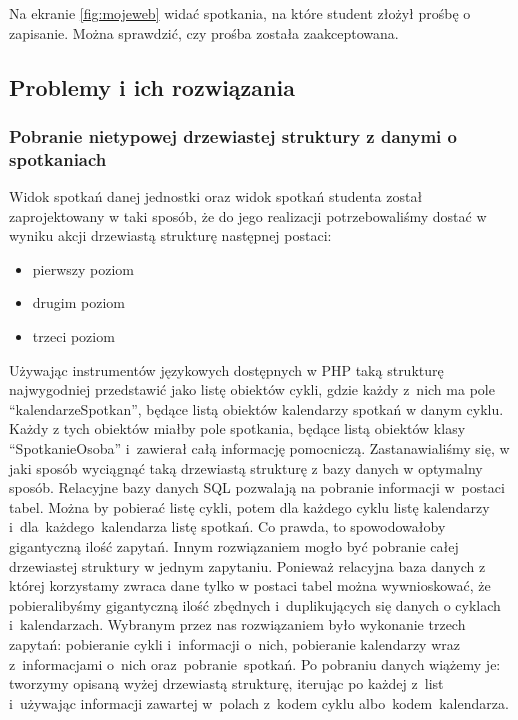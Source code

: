 \documentclass[licencjacka]{pracamgr}
\begin{document}
\begin{itemize}
Na ekranie \ref{fig:mojeweb} widać spotkania, na które student złożył prośbę o zapisanie. Można sprawdzić, czy prośba została zaakceptowana.

\subsection{Problemy i ich rozwiązania}
\subsubsection{Pobranie nietypowej drzewiastej struktury z danymi o spotkaniach}
Widok spotkań danej jednostki oraz widok spotkań studenta został zaprojektowany w taki sposób, że do jego realizacji potrzebowaliśmy dostać w wyniku akcji drzewiastą strukturę następnej postaci:

\begin{itemize}
\item{pierwszy poziom}
\item{drugim poziom}
\item{trzeci poziom}
\end{itemize}
Używając instrumentów językowych dostępnych w PHP taką strukturę najwygodniej przedstawić jako listę obiektów cykli, gdzie każdy z~nich ma pole \enquote{kalendarzeSpotkan}, będące listą obiektów kalendarzy spotkań w danym cyklu. Każdy z tych obiektów miałby pole spotkania, będące listą obiektów klasy \enquote{SpotkanieOsoba} i~zawierał całą informację pomocniczą. 
Zastanawialiśmy się, w jaki sposób wyciągnąć taką drzewiastą strukturę z bazy danych w optymalny sposób. Relacyjne bazy danych SQL pozwalają na pobranie informacji w~postaci tabel. Można by pobierać listę cykli, potem dla każdego cyklu listę kalendarzy i~dla~każdego~kalendarza listę spotkań. Co prawda, to spowodowałoby gigantyczną ilość zapytań. Innym rozwiązaniem mogło być pobranie całej drzewiastej struktury w jednym zapytaniu. Ponieważ relacyjna baza danych z której korzystamy zwraca dane tylko w postaci tabel można wywnioskować, że pobieralibyśmy gigantyczną ilość zbędnych i~duplikujących się danych o cyklach i~kalendarzach. Wybranym przez nas rozwiązaniem było wykonanie trzech zapytań: pobieranie cykli i~informacji o~nich, pobieranie kalendarzy wraz z~informacjami o~nich oraz~pobranie~spotkań. Po pobraniu danych wiążemy je: tworzymy opisaną wyżej drzewiastą strukturę, iterując po każdej z~list i~używając informacji zawartej w~polach z~kodem cyklu albo~kodem~kalendarza.


\end{itemize}
\end{document}
